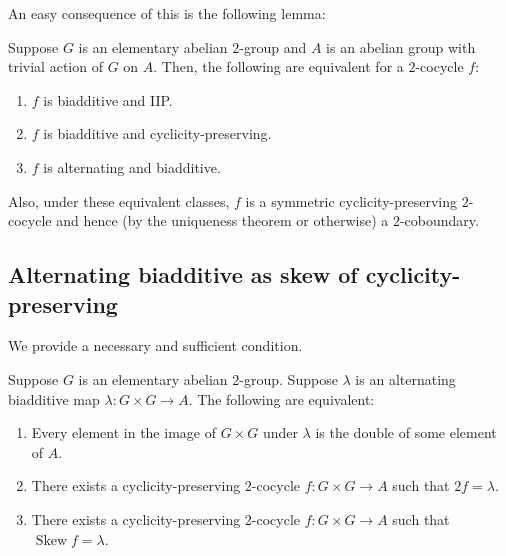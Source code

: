 \documentclass[10pt]{amsart}
\newcommand{\Skew}{\operatorname{Skew}}
\begin{document}
An easy consequence of this is the following lemma:

\begin{lemma}
  Suppose $G$ is an elementary abelian $2$-group and $A$ is an abelian
  group with trivial action of $G$ on $A$. Then, the following are
  equivalent for a $2$-cocycle $f$:

  \begin{enumerate}
  \item $f$ is biadditive and IIP.
  \item $f$ is biadditive and cyclicity-preserving.
  \item $f$ is alternating and biadditive.
  \end{enumerate}

  Also, under these equivalent classes, $f$ is a symmetric
  cyclicity-preserving $2$-cocycle and hence (by the uniqueness theorem
  or otherwise) a $2$-coboundary.
\end{lemma}

\subsection{Alternating biadditive as skew of cyclicity-preserving}

We provide a necessary and sufficient condition.

\begin{lemma}\label{alternatingbiadditiveisskewinelab2}
  Suppose $G$ is an elementary abelian $2$-group. Suppose $\lambda$ is
  an alternating biadditive map $\lambda:G \times G \to A$. The following are equivalent:

  \begin{enumerate}
  \item Every element in the image of $G \times G$ under $\lambda$ is
    the double of some element of $A$.
  \item There exists a cyclicity-preserving $2$-cocycle $f: G \times G
    \to A$ such that $2f = \lambda$.
  \item There exists a cyclicity-preserving $2$-cocycle $f: G \times G
    \to A$ such that $\Skew f = \lambda$.
  \end{enumerate}
\end{lemma}
\end{document}
